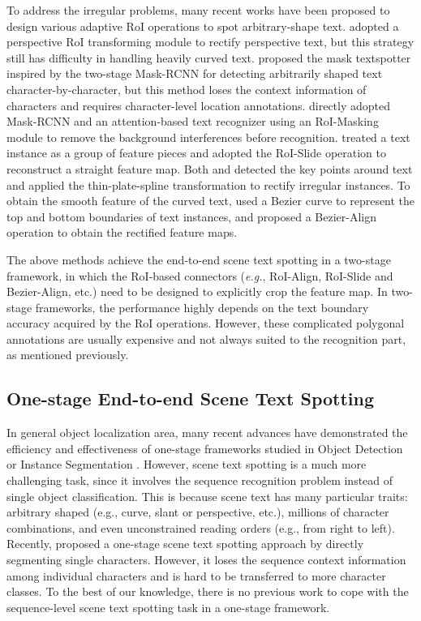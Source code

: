 \documentclass[letterpaper]{article} \usepackage{aaai21}  \usepackage{times}  \usepackage{helvet} \usepackage{courier}  \usepackage[hyphens]{url}  \usepackage{graphicx} \urlstyle{rm} \def\UrlFont{\rm}  \usepackage{natbib}  \usepackage{caption} \frenchspacing  \setlength{\pdfpagewidth}{8.5in}  \setlength{\pdfpageheight}{11in}  \usepackage{multirow}
\begin{document}
To address the irregular problems, many recent works have been proposed to design various adaptive RoI operations to spot arbitrary-shape text.
\cite{sun2018textnet} adopted a perspective RoI transforming module to rectify perspective text, but this strategy still has difficulty in handling heavily curved text.
\cite{liao2019mask} proposed the mask textspotter inspired by the two-stage Mask-RCNN for detecting arbitrarily shaped text character-by-character, but this method loses the context information of characters and requires character-level location annotations.
\cite{qin2019towards} directly adopted Mask-RCNN and an attention-based text recognizer using an RoI-Masking module to remove the background interferences before recognition.
\cite{feng2019textdragon} treated a text instance as a group of feature pieces and adopted the RoI-Slide operation to reconstruct a straight feature map.
Both \cite{qiao2020text} and \cite{wang2020all} detected the key points around text and applied the thin-plate-spline transformation \cite{bookstein1989principal} to rectify irregular instances.
To obtain the smooth feature of the curved text, \cite{liu2020abcnet} used a Bezier curve to represent the top and bottom boundaries of text instances, and proposed a Bezier-Align operation to obtain the rectified feature maps.

The above methods achieve the end-to-end scene text spotting in a two-stage framework, in which the RoI-based connectors (\emph{e.g.}, RoI-Align, RoI-Slide and Bezier-Align, etc.) need to be designed to explicitly crop the feature map.
In two-stage frameworks, the performance highly depends on the text boundary accuracy acquired by the RoI operations. However, these complicated polygonal annotations are usually expensive and not always suited to the recognition part, as mentioned previously.

\subsection{One-stage End-to-end Scene Text Spotting}
In general object localization area, many recent advances have demonstrated the efficiency and effectiveness of one-stage frameworks studied in Object Detection \cite{Redmon2016You, liu2016ssd,lin2017focal,tian2019fcos, duan2019centernet} or Instance Segmentation \cite{wang2019solo,tian2020conditional,wang2020solov2,xie2020polarmask,chen2020blendmask}.
However, scene text spotting is a much more challenging task, since it involves the sequence recognition problem instead of single object classification.
This is because scene text has many particular traits: arbitrary shaped (e.g., curve, slant or perspective, etc.), millions of character combinations, and even unconstrained reading orders (e.g., from right to left).
Recently, \cite{xing2019convolutional} proposed a one-stage scene text spotting approach by directly segmenting single characters. However, it loses the sequence context information among individual characters and is hard to be transferred to more character classes.
To the best of our knowledge, there is no previous work to cope with the sequence-level scene text spotting task in a one-stage framework.
\end{document}
